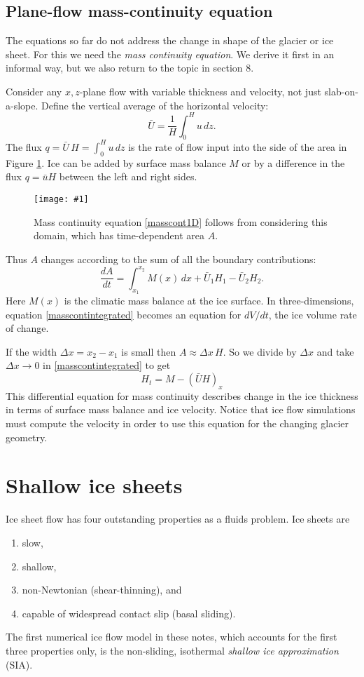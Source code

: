 \documentclass[letterpaper,final,12pt,reqno]{amsart}
\newcommand{\onefigsize}[3]{
\begin{figure}[ht]
\centering
\texttt{[image: \#1]}
\caption{#2}
\label{fig:#1}
\end{figure}}
\begin{document}
\subsection*{Plane-flow mass-continuity equation}  The equations so far do not address the change in shape of the glacier or ice sheet.  For this we need the \emph{mass continuity equation}.  We derive it first in an informal way, but we also return to the topic in section 8.

Consider any $x,z$-plane flow with variable thickness and velocity, not just slab-on-a-slope.  Define the vertical average of the horizontal velocity:
	$$\bar U = \frac{1}{H}\int_0^{H} u\,dz.$$
The flux $q=\bar U\, H = \int_0^{H} u\,dz$ is the rate of flow input into the side of the area in Figure \ref{fig:slabmasscontfig}.  Ice can be added by surface mass balance $M$ or by a difference in the flux $q=\bar u H$ between the left and right sides.

\onefigsize{slabmasscontfig}{Mass continuity equation \eqref{masscont1D} follows from considering this domain, which has time-dependent area $A$.}{2.5in}

Thus $A$ changes according to the sum of all the boundary contributions:
\begin{equation}
\frac{dA}{dt} = \int_{x_1}^{x_2} M(x)\,dx + \bar U_1 H_1 - \bar U_2 H_2. \label{masscontintegrated}
\end{equation}
Here $M(x)$ is the climatic mass balance at the ice surface.  In three-dimensions, equation \eqref{masscontintegrated} becomes an equation for $dV/dt$, the ice volume rate of change.

If the width $\Delta x=x_2-x_1$ is small then $A\approx \Delta x\, H$.  So we divide by $\Delta x$ and take $\Delta x \to 0$ in \eqref{masscontintegrated} to get
\begin{equation}
H_t = M - \left(\bar U H\right)_x \label{masscont1D}
\end{equation}
This differential equation for mass continuity describes change in the ice thickness in terms of surface mass balance and ice velocity.  Notice that ice flow simulations must compute the velocity in order to use this equation for the changing glacier geometry.


\section{Shallow ice sheets}   \label{sec:sia}

Ice sheet flow has four outstanding properties as a fluids problem.  Ice sheets are
\renewcommand{\labelenumi}{(\emph{\roman{enumi}})}
\begin{enumerate}
\item slow,
\item shallow,
\item non-Newtonian (shear-thinning), and
\item capable of widespread contact slip (basal sliding).
\end{enumerate}
The first numerical ice flow model in these notes, which accounts for the first three properties only, is the non-sliding, isothermal \emph{shallow ice approximation} (SIA).
\end{document}
